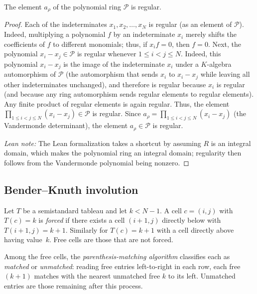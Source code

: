 \begin{lemma}
\label{lem.sf.arho-reg}
\leantarget
\leanok
The element $a_{\rho}$ of the polynomial ring
$\mathcal{P}$ is regular.
\end{lemma}

\begin{proof}
\leanok
Each of the
indeterminates $x_{1},x_{2},\ldots,x_{N}$ is regular (as an element of
$\mathcal{P}$). Indeed, multiplying a polynomial $f$ by an indeterminate
$x_{i}$ merely shifts the coefficients of $f$ to different monomials; thus, if
$x_{i}f=0$, then $f=0$. Next, the polynomial $x_{i}-x_{j}%
\in\mathcal{P}$ is regular whenever $1\leq i<j\leq N$. Indeed, this polynomial
$x_{i}-x_{j}$ is the image of the indeterminate $x_{i}$ under a
$K$-algebra automorphism of $\mathcal{P}$ (the automorphism that
sends $x_{i}$ to $x_{i}-x_{j}$ while leaving all other indeterminates
unchanged), and therefore is regular because $x_{i}$ is
regular (and because any ring automorphism sends regular elements to regular
elements). Any finite product of regular elements is again regular. Thus,
the element $\prod_{1\leq i<j\leq N}\left(  x_{i}-x_{j}\right)  \in
\mathcal{P}$ is regular. Since
$a_{\rho} = \prod_{1\leq i<j\leq N}\left(  x_{i}-x_{j}\right)$
(the Vandermonde determinant), the element
$a_{\rho}\in\mathcal{P}$ is regular.

\emph{Lean note:} The Lean formalization takes a shortcut by assuming $R$ is
an integral domain, which makes the polynomial ring an integral domain;
regularity then follows from the Vandermonde polynomial being nonzero.
\end{proof}

\subsection{Bender--Knuth involution}

\begin{definition}
\label{def.sf.bk-forced-free}
\leanhelper
\leanok
Let $T$ be a semistandard tableau and let $k < N-1$.
A cell $c = (i,j)$ with $T(c) = k$ is \emph{forced} if there exists a cell
$(i+1,j)$ directly below with $T(i+1,j) = k+1$. Similarly for $T(c) = k+1$ with a cell directly above
having value~$k$. Free cells are those that are not forced.

Among the free cells, the \emph{parenthesis-matching algorithm} classifies
each as \emph{matched} or \emph{unmatched}: reading free entries left-to-right
in each row, each free $(k{+}1)$ matches with the nearest unmatched free $k$
to its left. Unmatched entries are those remaining after this process.
\end{definition}

